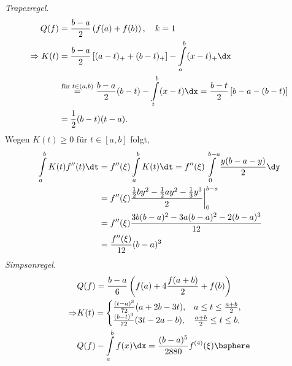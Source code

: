 \begin{bspn}
\textit{Trapezregel.}
\begin{align*}
Q(f) &= \frac{b-a}{2}\left(f(a) + f(b) \right),\quad k=1\\
\Rightarrow K(t) &= \frac{b-a}{2}\left[(a-t)_+ + (b-t)_+\right] -
\int\limits_a^b (x-t)_+\dx\\
&\overset{\text{für }t\in(a,b)}{=}
\frac{b-a}{2}(b-t)- \int\limits_t^b (x-t)\dx
= \frac{b-t}{2}\left[b-a-(b-t)\right] \\& = \frac{1}{2}(b-t)(t-a).
\end{align*}
Wegen $K(t)\ge0$ für $t\in[a,b]$ folgt,
\begin{align*}
\int\limits_a^b K(t)f''(t)\dt &= f''(\xi)\int\limits_a^b K(t)\dt
= f''(\xi)\int\limits_0^{b-a} \frac{y(b-a-y)}{2} \dy\\
&= f''(\xi) \frac{\frac{1}{2}by^2 - \frac{1}{2}ay^2 -
\frac{1}{3}y^3}{2}\bigg|_0^{b-a}\\
&= f''(\xi) \frac{3b(b-a)^2 - 3a(b-a)^2 -
2(b-a)^3}{12}\\
&=\frac{f''(\xi)}{12}(b-a)^3
\end{align*}
\textit{Simpsonregel.}
\begin{align*}
&Q(f) = \frac{b-a}{6}\left(f(a) + 4\frac{f(a+b)}{2} + f(b) \right)\\ 
\Rightarrow &K(t) = 
\begin{cases}
\frac{(t-a)^3}{72}(a+2b-3t), & a\le t\le \frac{a+b}{2},\\
\frac{(b-t)^3}{72}(3t-2a-b), & \frac{a+b}{2}\le t\le b,
\end{cases}\\
&Q(f) -\int\limits_a^b f(x)\dx = \frac{(b-a)^5}{2880} f^{(4)}(\xi)\bsphere
\end{align*}
\end{bspn}

